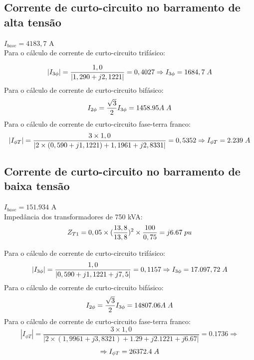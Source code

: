 \subsection{Corrente de curto-circuito no barramento de alta tensão}
$I_{base}=4183,7$ A\\
Para o cálculo de corrente de curto-circuito trifásico:

\begin{equation*}
|{{I}_{3\phi}}|= \frac{1,0}{|{1,290 + j 2, 1221}|}=0,4027 \Rightarrow {{I}_{3\phi}}= 1684,7 \hspace{0.1cm}A
\end{equation*}
Para o cálculo de corrente de curto-circuito bifásico:
\begin{equation*}
{I}_{2\phi}= \frac{\sqrt{3}}{2}{I}_{3\phi}= 1458.95A\hspace{0.1cm}A
\end{equation*}
Para o cálculo de corrente de curto-circuito fase-terra franco:
\begin{equation*}
|{{I}_{\phi T}}|= \frac{ 3\times 1,0 }{|{2\times (0,590+j1,1221)+1,1961+j2,8331}|}=0,5352 \Rightarrow {I}_{\phi T}= 2.239 \hspace{0.1cm}A
\end{equation*}

\subsection{Corrente de curto-circuito no barramento de baixa tensão}
$I_{base}$$=151.934$ A\\
Impedância dos transformadores de 750 kVA:
\begin{equation*}
{Z}_{T1}=0,05\times {(\frac{13,8}{13,8}})^{2}\times \frac{100}{0,75}=j6.67\hspace{0.1cm}pu
\end{equation*}

Para o cálculo de corrente de curto-circuito trifásico:
\begin{equation*}
|{I}_{3\phi}|=\frac{1,0}{|0,590+j1,1221+j7,5|}=0,1157  \Rightarrow {I}_{3\phi}= 17.097,72 \hspace{0.1cm}A
\end{equation*}
Para o cálculo de corrente de curto-circuito bifásico:
\begin{equation*}
{I}_{2\phi}=\frac{\sqrt{3}}{2}{I}_{3\phi}= 14807.06A\hspace{0.1cm}A
\end{equation*}
Para o cálculo de corrente de curto-circuito fase-terra franco:
\begin{equation*}
|{I}_{\phi T}|=\frac{ 3\times 1,0}{|2\times (1,9961 + j 3,8321)+1.29+j2.1221+j6.67|}=0.1736 \Rightarrow	
\end{equation*}
\begin{equation*}
 \Rightarrow {I}_{\phi T}= 26372.4 \hspace{0.1cm}A
\end{equation*}


